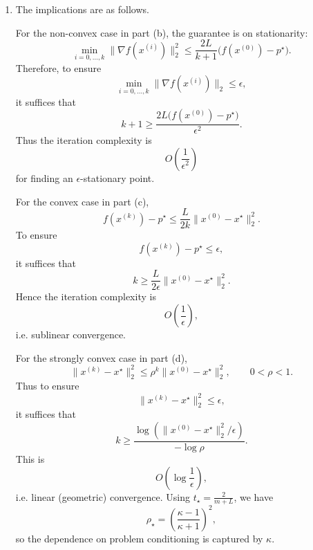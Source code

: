\documentclass[11pt,letter,notitlepage]{article}
\theoremstyle{definition}
\begin{document}
\begin{solution}
\begin{enumerate}[label=(\alph*)]
    \item The implications are as follows.

    For the non-convex case in part (b), the guarantee is on stationarity:
    \[
    \min_{i=0,\dots,k}\|\nabla f(x^{(i)})\|_2^2
    \le
    \frac{2L}{k+1}\bigl(f(x^{(0)})-p^\star\bigr).
    \]
    Therefore, to ensure
    \[
    \min_{i=0,\dots,k}\|\nabla f(x^{(i)})\|_2\le \epsilon,
    \]
    it suffices that
    \[
    k+1\ge \frac{2L\bigl(f(x^{(0)})-p^\star\bigr)}{\epsilon^2}.
    \]
    Thus the iteration complexity is
    \[
    O\!\left(\frac1{\epsilon^2}\right)
    \]
    for finding an $\epsilon$-stationary point.

    For the convex case in part (c),
    \[
    f(x^{(k)})-p^\star
    \le
    \frac{L}{2k}\|x^{(0)}-x^\star\|_2^2.
    \]
    To ensure
    \[
    f(x^{(k)})-p^\star\le \epsilon,
    \]
    it suffices that
    \[
    k\ge \frac{L}{2\epsilon}\|x^{(0)}-x^\star\|_2^2.
    \]
    Hence the iteration complexity is
    \[
    O\!\left(\frac1\epsilon\right),
    \]
    i.e. sublinear convergence.

    For the strongly convex case in part (d),
    \[
    \|x^{(k)}-x^\star\|_2^2
    \le
    \rho^k\|x^{(0)}-x^\star\|_2^2,
    \qquad 0<\rho<1.
    \]
    Thus to ensure
    \[
    \|x^{(k)}-x^\star\|_2^2\le \epsilon,
    \]
    it suffices that
    \[
    k\ge
    \frac{\log(\|x^{(0)}-x^\star\|_2^2/\epsilon)}{-\log \rho}.
    \]
    This is
    \[
    O\!\left(\log\frac1\epsilon\right),
    \]
    i.e. linear (geometric) convergence. Using $t_\star=\frac{2}{m+L}$, we have
    \[
    \rho_\star=\left(\frac{\kappa-1}{\kappa+1}\right)^2,
    \]
    so the dependence on problem conditioning is captured by $\kappa$.
\end{enumerate}
\end{solution}

\newpage
\end{document}
